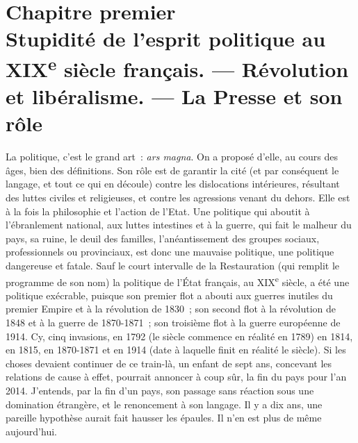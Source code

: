\documentclass[french,twoside]{book} %
\newcommand\chapteropen{} %
\newcommand\chaptercont{} %
\begin{document}
\chapteropen
\chapter[{Chapitre premier. Stupidité de l’esprit politique au XIXe siècle français. — Révolution et libéralisme. — La Presse et son rôle}]{Chapitre premier\\
Stupidité de l’esprit politique au XIX\textsuperscript{e} siècle français. — Révolution et libéralisme. — La Presse et son rôle}\renewcommand{\leftmark}{Chapitre premier\\
Stupidité de l’esprit politique au XIX\textsuperscript{e} siècle français. — Révolution et libéralisme. — La Presse et son rôle}


\chaptercont
\noindent La politique, c’est le grand art : {\itshape ars magna}. On a proposé d’elle, au cours des âges, bien des définitions. Son rôle est de garantir la cité (et par conséquent le langage, et tout ce qui en découle) contre les dislocations intérieures, résultant des luttes civiles et religieuses, et contre les agressions venant du dehors. Elle est à la fois la philosophie et l’action de l’Etat. Une politique qui aboutit à l’ébranlement national, aux luttes intestines et à la guerre, qui fait le malheur du pays, sa ruine, le deuil des familles, l’anéantissement des groupes sociaux, professionnels ou provinciaux, est donc une mauvaise politique, une politique dangereuse et fatale. Sauf le court intervalle de la Restauration (qui remplit le programme de son nom) la politique de l’État français, au XIX\textsuperscript{e} siècle, a été une politique exécrable, puisque son premier flot a abouti aux guerres inutiles du premier Empire et à la révolution de 1830 ; son second flot à la révolution de 1848 et à la guerre de 1870-1871 ; son troisième flot à la guerre européenne de 1914. Cy, cinq invasions, en 1792 (le siècle commence en réalité en 1789) en 1814, en 1815, en 1870-1871 et en 1914 (date à laquelle finit en réalité le siècle). Si les choses devaient continuer de ce train-là, un enfant de sept ans, concevant les relations de cause à effet, pourrait annoncer à coup sûr, la fin du pays pour l’an 2014. J’entends, par la fin d’un pays, son passage sans réaction sous une domination étrangère, et le renoncement à son langage. Il y a dix ans, une pareille hypothèse aurait fait hausser les épaules. Il n’en est plus de même aujourd’hui.\par
\end{document}
